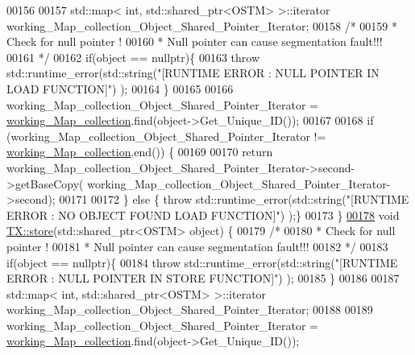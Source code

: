 \begin{DoxyCode}
00156 
00157     std::map< int, std::shared\_ptr<OSTM> >::iterator working\_Map\_collection\_Object\_Shared\_Pointer\_Iterator;
00158     \textcolor{comment}{/*}
00159 \textcolor{comment}{     * Check for null pointer !}
00160 \textcolor{comment}{     * Null pointer can cause segmentation fault!!!}
00161 \textcolor{comment}{     */}
00162     \textcolor{keywordflow}{if}(\textcolor{keywordtype}{object} == \textcolor{keyword}{nullptr})\{
00163         \textcolor{keywordflow}{throw} std::runtime\_error(std::string(\textcolor{stringliteral}{"[RUNTIME ERROR : NULL POINTER IN LOAD FUNCTION]"}) );
00164     \}
00165 
00166         working\_Map\_collection\_Object\_Shared\_Pointer\_Iterator = 
      \hyperlink{class_t_x_a81aafda16e2f20e36ec6c68e584668ff_a81aafda16e2f20e36ec6c68e584668ff}{working\_Map\_collection}.find(object->Get\_Unique\_ID());
00167 
00168     \textcolor{keywordflow}{if} (working\_Map\_collection\_Object\_Shared\_Pointer\_Iterator != 
      \hyperlink{class_t_x_a81aafda16e2f20e36ec6c68e584668ff_a81aafda16e2f20e36ec6c68e584668ff}{working\_Map\_collection}.end()) \{
00169 
00170         \textcolor{keywordflow}{return} working\_Map\_collection\_Object\_Shared\_Pointer\_Iterator->second->getBaseCopy(
      working\_Map\_collection\_Object\_Shared\_Pointer\_Iterator->second);
00171         
00172     \} \textcolor{keywordflow}{else} \{ \textcolor{keywordflow}{throw} std::runtime\_error(std::string(\textcolor{stringliteral}{"[RUNTIME ERROR : NO OBJECT FOUND LOAD FUNCTION]"}) );\}
00173 \}
\hypertarget{_t_x_8cpp_source.tex_l00178}{}\hyperlink{class_t_x_a7dbcb369aa4a3370b6c6829d278ece5d_a7dbcb369aa4a3370b6c6829d278ece5d}{00178} \textcolor{keywordtype}{void} \hyperlink{class_t_x_a7dbcb369aa4a3370b6c6829d278ece5d_a7dbcb369aa4a3370b6c6829d278ece5d}{TX::store}(std::shared\_ptr<OSTM> \textcolor{keywordtype}{object}) \{
00179     \textcolor{comment}{/*}
00180 \textcolor{comment}{     * Check for null pointer !}
00181 \textcolor{comment}{     * Null pointer can cause segmentation fault!!!}
00182 \textcolor{comment}{     */}
00183     \textcolor{keywordflow}{if}(\textcolor{keywordtype}{object} == \textcolor{keyword}{nullptr})\{
00184         \textcolor{keywordflow}{throw} std::runtime\_error(std::string(\textcolor{stringliteral}{"[RUNTIME ERROR : NULL POINTER IN STORE FUNCTION]"}) );
00185     \}
00186     
00187     std::map< int, std::shared\_ptr<OSTM> >::iterator working\_Map\_collection\_Object\_Shared\_Pointer\_Iterator;
00188 
00189     working\_Map\_collection\_Object\_Shared\_Pointer\_Iterator = 
      \hyperlink{class_t_x_a81aafda16e2f20e36ec6c68e584668ff_a81aafda16e2f20e36ec6c68e584668ff}{working\_Map\_collection}.find(object->Get\_Unique\_ID());

\end{DoxyCode}
